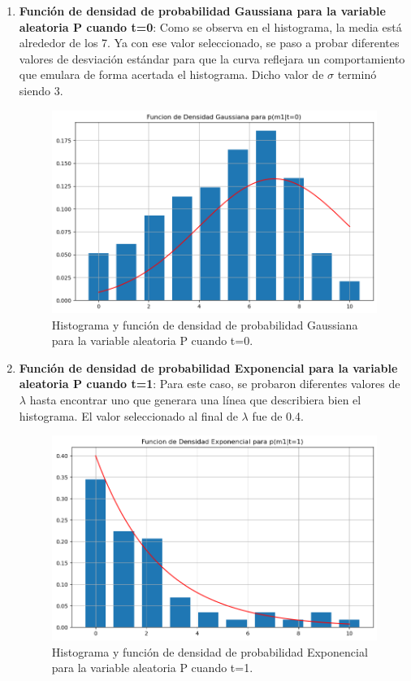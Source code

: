 \documentclass[spanish,english]{article}
\begin{document}
\begin{enumerate}
\begin{enumerate}
    \item \textbf{Funci\'{o}n de densidad de probabilidad Gaussiana para la variable aleatoria P cuando t=0}: Como se observa en el histograma, la media est\'{a} alrededor de los 7. Ya con ese valor seleccionado, se paso a probar diferentes valores de desviaci\'{o}n est\'{a}ndar para que la curva reflejara un comportamiento que emulara de forma acertada el histograma. Dicho valor de $\sigma$ termin\'{o} siendo 3.

    \begin{figure}[hbtp!]
        \centering
        \includegraphics[width=0.75\linewidth]{Quiz_2//Imagenes/pdf_precipitacion_t0.png}
        \caption{Histograma y funci\'{o}n de densidad de probabilidad Gaussiana para la variable aleatoria P cuando t=0.}
        \label{fig:hist_pdf_p_t0}
    \end{figure}\newpage

    \item \textbf{Funci\'{o}n de densidad de probabilidad Exponencial para la variable aleatoria P cuando t=1}: Para este caso, se probaron diferentes valores de $\lambda$ hasta encontrar uno que generara una l\'{i}nea que describiera bien el histograma. El valor seleccionado al final de $\lambda$ fue de 0.4.

    \begin{figure}[hbtp!]
        \centering
        \includegraphics[width=0.75\linewidth]{Quiz_2//Imagenes/pdf_precipitacion_t1.png}
        \caption{Histograma y funci\'{o}n de densidad de probabilidad Exponencial para la variable aleatoria P cuando t=1.}
        \label{fig:hist_pdf_p_t1}
    \end{figure}\newpage


\end{enumerate}
\end{enumerate}
\end{document}
